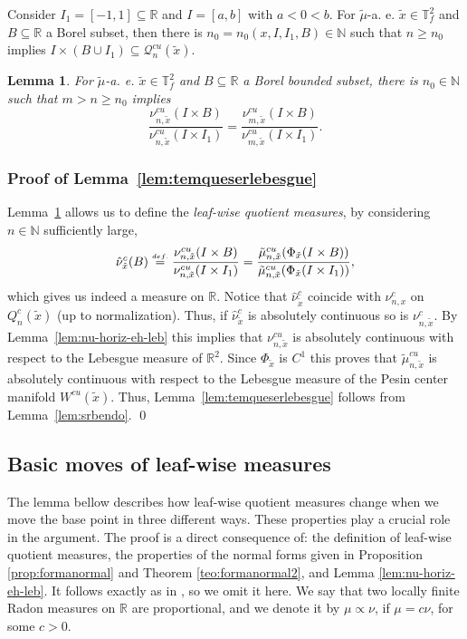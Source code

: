 \documentclass[a4paper,11pt,reqno]{amsart}
\newcommand{\R}{{\mathbb R}}
\newcommand{\N}{{\mathbb N}}
\newcommand{\TTf}{{\mathbb{T}_f^2}}
\newcommand{\eqdef}{\stackrel{\scriptscriptstyle\textrm def.}{=}}
\newcommand{\tix}{\tilde{x}}
\newtheorem{lemma}[theorem]{Lemma}
\theoremstyle{definition}
\begin{document}
Consider $I_1 = [-1, 1] \subseteq \R$ and $I = [a,b]$ with $a < 0 < b$. For $\tilde{\mu}$-a. e. $\tilde{x} \in \TTf$ and $B \subseteq \R$ a Borel subset, then there is $n_0 = n_0(x, I, I_1, B) \in \N$ such that $n \geq n_0$ implies $I \times (B \cup I_1) \subseteq \mathcal{Q}^{cu}_n(\tix)$.

\begin{lemma}
    \label{lem:nu-converge}
    For $\tilde{\mu}$-a. e. $\tilde{x} \in \TTf$ and $B \subseteq \R$ a Borel bounded subset, there is $n_0 \in \N$ such that $m > n \geq n_0$ implies
    $$\dfrac{\nu^{cu}_{n, \tilde{x}}(I \times B)}{\nu^{cu}_{n, \tilde{x}}(I \times I_1)} = \dfrac{\nu^{cu}_{m, \tilde{x}}(I \times B)}{\nu^{cu}_{m, \tilde{x}}(I \times I_1)}.$$
\end{lemma}

\subsubsection{Proof of Lemma~\ref{lem:temqueserlebesgue}} Lemma~\ref{lem:nu-converge} allows us to define the \textit{leaf-wise quotient measures}, by considering $n \in \N$ sufficiently large, 
$$\hat{\nu}^c_{\tix}(B) \eqdef \dfrac{\nu^{cu}_{n, \tilde{x}}(I \times B)}{\nu^{cu}_{n, \tilde{x}}(I \times I_1)} = \dfrac{\tilde{\mu}^{cu}_{n, \tilde{x}}(\Phi_{\tix}(I \times B))}{\tilde{\mu}^{cu}_{n, \tilde{x}}(\Phi_{\tix}(I \times I_1))},$$
which gives us indeed a measure on $\R$. Notice that $\hat{\nu}^c_{\tix}$ coincide with $\nu^c_{n,x}$ on $Q^c_{n}(\tix)$ (up to normalization). Thus, if $\hat{\nu}^c_{\tix}$ is absolutely continuous so is $\nu^c_{n,\tix}$. By Lemma~\ref{lem:nu-horiz-eh-leb} this implies that $\nu^{cu}_{n,\tix}$ is absolutely continuous with respect to the Lebesgue measure of $\R^2$. Since $\Phi_{\tix}$ is $C^1$ this proves that $\tilde{\mu}^{cu}_{n,\tix}$ is absolutely continuous with respect to the Lebesgue measure of the Pesin center manifold $W^{cu}(\tix)$. Thus, Lemma~\ref{lem:temqueserlebesgue} follows from Lemma~\ref{lem:srbendo}. \qed

\subsection{Basic moves of leaf-wise measures} 
\label{sec:normal-basicmoves}

The lemma bellow describes how leaf-wise quotient measures change when we move the base point in three different ways. These properties play a crucial role in the argument. The proof is a direct consequence of: the definition of leaf-wise quotient measures, the properties of the normal forms given in Proposition \ref{prop:formanormal} and Theorem \ref{teo:formanormal2}, and Lemma \ref{lem:nu-horiz-eh-leb}. It follows exactly as in \cite{ALOS}, so we omit it here. We say that two locally finite Radon measures on $\R$ are proportional, and we denote it by $\mu\propto\nu$, if $\mu=c\nu$, for some $c>0$.
\end{document}
